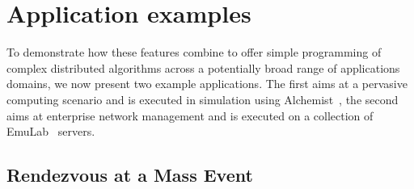 \documentclass[12pt,a4paper,twoside,openright]{book}
\begin{document}
\section{Application examples}
\label{protelis-applications}

To demonstrate how these features combine to offer simple programming of complex distributed algorithms across a potentially broad range of applications domains, we now present two example applications.
%
The first aims at a pervasive computing scenario and is executed in simulation using Alchemist~\cite{alchemist-jos2013}, the second aims at enterprise network management and is executed on a collection of EmuLab~\cite{EmuLab} servers.

\subsection{Rendezvous at a Mass Event}
\label{protelis-rendezvous}
\end{document}

